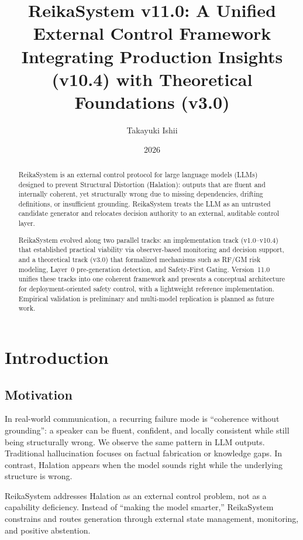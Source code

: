 \documentclass[11pt,a4paper]{article}
\title{ReikaSystem v11.0: A Unified External Control Framework\\
\large Integrating Production Insights (v10.4) with Theoretical Foundations (v3.0)}
\author{Takayuki Ishii}
\date{2026}
\begin{document}
\maketitle

\begin{abstract}
ReikaSystem is an external control protocol for large language models (LLMs) designed to
prevent Structural Distortion (Halation): outputs that are fluent and internally coherent, yet
structurally wrong due to missing dependencies, drifting definitions, or insufficient grounding.
ReikaSystem treats the LLM as an untrusted candidate generator and relocates decision
authority to an external, auditable control layer.

ReikaSystem evolved along two parallel tracks: an implementation track (v1.0--v10.4)
that established practical viability via observer-based monitoring and decision support, and
a theoretical track (v3.0) that formalized mechanisms such as RF/GM risk modeling, Layer~0
pre-generation detection, and Safety-First Gating. Version~11.0 unifies these tracks into one
coherent framework and presents a conceptual architecture for
deployment-oriented safety control, with a lightweight reference implementation. Empirical validation is preliminary and
multi-model replication is planned as future work.
\end{abstract}

\section{Introduction}

\subsection{Motivation}
In real-world communication, a recurring failure mode is ``coherence without grounding'': a
speaker can be fluent, confident, and locally consistent while still being structurally wrong.
We observe the same pattern in LLM outputs. Traditional hallucination focuses on factual
fabrication or knowledge gaps. In contrast, Halation appears when the model sounds right while
the underlying structure is wrong.

ReikaSystem addresses Halation as an external control problem, not as a capability deficiency.
Instead of ``making the model smarter,'' ReikaSystem constrains and routes generation through
external state management, monitoring, and positive abstention.
\end{document}

